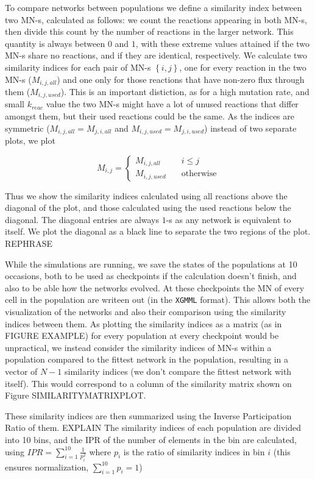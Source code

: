 \documentclass[10pt,a4paper]{article}
\begin{document}
To compare networks between populations we define a similarity index between two MN-s, calculated as follows: we count the reactions appearing in both MN-s, then divide this count by the number of reactions in the larger network. This quantity is always between $0$ and $1$, with these extreme values attained if the two MN-s share no reactions, and if they are identical, respectively. We calculate two similarity indices for each pair of MN-s $ \left\{ i,j \right\}$, one for every reaction in the two MN-s ($M_{i,j,all}$) and one only for those reactions that have non-zero flux through them ($M_{i,j,used}$). This is an important distiction, as for a high mutation rate, and small $k_{reac}$ value the two MN-s might have a lot of unused reactions that differ amongst them, but their used reactions could be the same.  As the indices are symmetric ($M_{i,j,all}=M_{j,i,all}$ and  $M_{i,j,used}=M_{j,i,used}$) instead of two separate plots, we plot 

$$
M_{i,j}= \left\{
	\begin{array}{ll}
		M_{i,j,all} & \quad i \leq j \\
		M_{i,j,used} & \quad \text{otherwise}
	\end{array}
\right.
$$

Thus we show the similarity indices calculated using all reactions above the diagonal of the plot, and those calculated using the used reactions below the diagonal. The diagonal entries are always $1$-s as any network is equivalent to itself. We plot the diagonal as a black line to separate the two regions of the plot. REPHRASE

While the simulations are running, we save the states of the populations at 10 occasions, both to be used as checkpoints if the calculation doesn't finish, and also to be able how the networks evolved. At these checkpoints the MN of every cell in the population are writeen out (in the \texttt{XGMML} format). This allows both the visualization of the networks and also their comparison using the similarity indices between them. As plotting the similarity indices as a matrix (as in FIGURE EXAMPLE) for every population at every checkpoint would be unpractical, we instead consider the similarity indices of MN-s within a population compared to the fittest network in the population, resulting in a vector of $N-1$ similarity indices (we don't compare the fittest network with itself). This would correspond to a column of the similarity matrix shown on Figure SIMILARITYMATRIXPLOT.

These similarity indices are then summarized using the Inverse Participation Ratio of them. EXPLAIN  The similarity indices of each population are divided into 10 bins, and the IPR of the number of elements in the bin are calculated, using $IPR= \sum^{10}_{i=1} \frac{1}{p_i^2} $ where $p_i$ is the ratio of similarity indices in bin $i$ (this ensures normalization, $ \sum^{10}_{i=1} p_i=1$) 
\end{document}
